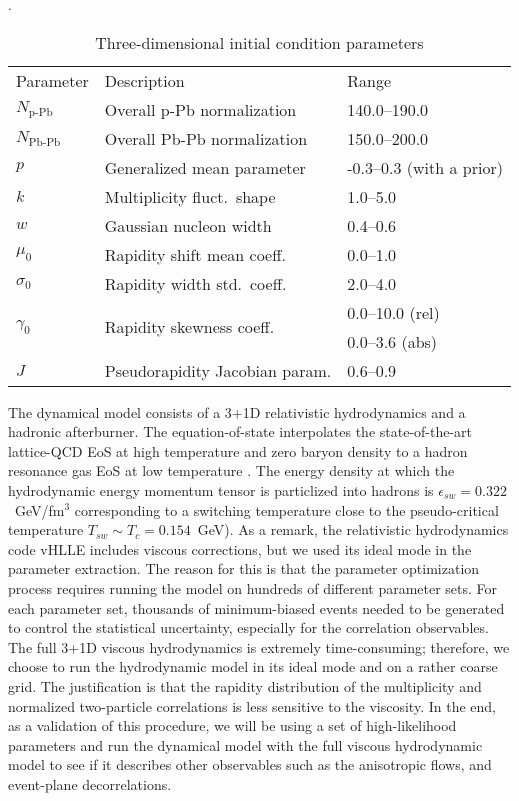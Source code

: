 \begin{table}
\centering
\caption{Three-dimensional initial condition parameters}
\label{tab:trento:parameters}.
\begin{tabular}{lll}
      Parameter & Description	& Range \\
      \paddedhline
      $N_{\textrm{p-Pb}}$    & Overall p-Pb normalization      & 140.0--190.0 \\
      $N_{\textrm{Pb-Pb}}$   & Overall Pb-Pb normalization     & 150.0--200.0  \\
      $p$	                   & Generalized mean parameter      & -0.3--0.3 (with a prior)  \\
      $k$	                   & Multiplicity fluct.\ shape      & 1.0--5.0  \\
      $w$	                   & Gaussian nucleon width     & 0.4--0.6  \\
      $\mu_0$                & Rapidity shift mean coeff.\     & 0.0--1.0  \\
      $\sigma_0$             & Rapidity width std.\ coeff.\    & 2.0--4.0  \\
      \multirow{2}{*}{$\gamma_0$}             & \multirow{2}{*}{Rapidity skewness coeff.\ }      & 0.0--10.0 (rel) \\
                  &        & 0.0--3.6 (abs)  \\
      $J$	                   & Pseudorapidity Jacobian param.  & 0.6--0.9
\end{tabular}  
\end{table}

The dynamical model consists of a 3+1D relativistic hydrodynamics and a hadronic afterburner.
The equation-of-state interpolates the state-of-the-art lattice-QCD EoS \cite{Bazavov:2014pvz} at high temperature and zero baryon density to a hadron resonance gas EoS at low temperature \cite{Moreland:2015dvc}.
The energy density at which the hydrodynamic energy momentum tensor is particlized into hadrons is $\epsilon_{sw} = 0.322$~GeV/fm$^3$ corresponding to a switching temperature close to the pseudo-critical temperature $T_{sw} \sim T_c = 0.154$~GeV).
As a remark, the relativistic hydrodynamics code vHLLE \cite{Karpenko:2013wva} includes viscous corrections, but we used its ideal mode in the parameter extraction.
The reason for this is that the parameter optimization process requires running the model on hundreds of different parameter sets.
For each parameter set, thousands of minimum-biased events needed to be generated to control the statistical uncertainty, especially for the correlation observables. 
The full 3+1D viscous hydrodynamics is extremely time-consuming; therefore, we choose to run the hydrodynamic model in its ideal mode and on a rather coarse grid.
The justification is that the rapidity distribution of the multiplicity and normalized two-particle correlations is less sensitive to the viscosity.
In the end, as a validation of this procedure, we will be using a set of high-likelihood parameters and run the dynamical model with the full viscous hydrodynamic model to see if it describes other observables such as the anisotropic flows, and event-plane decorrelations.

